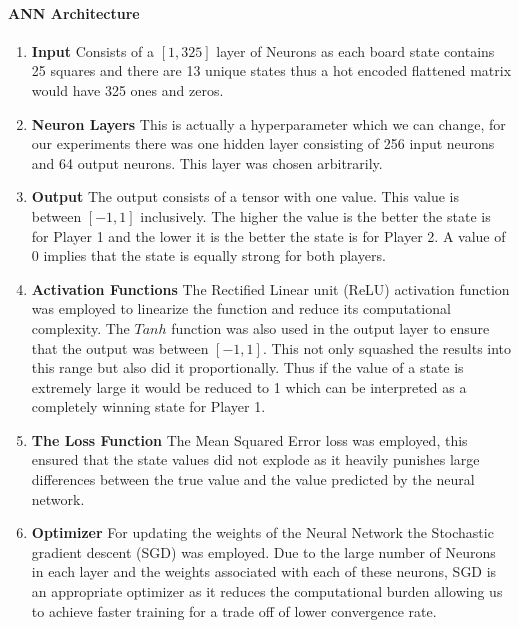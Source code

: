 \documentclass[a4paper,12pt,table]{article}
\begin{document}
\paragraph{ANN Architecture}
\begin{enumerate}
    \item \textbf{Input}
    \newline
    Consists of a $[1,325]$ layer of Neurons as each board state contains 25 squares and there are 13 unique states thus a hot encoded flattened matrix would have 325 ones and zeros.
    \item \textbf{Neuron Layers}
    \newline
    This is actually a hyperparameter which we can change, for our experiments there was one hidden layer consisting of 256 input neurons and 64 output neurons. This layer was chosen arbitrarily.
    \item \textbf{Output}
    \newline
    The output consists of a tensor with one value. This value is between $[-1,1]$ inclusively. The higher the value is the better the state is for Player 1 and the lower it is the better the state is for Player 2. A value of 0 implies that the state is equally strong for both players.
    \item \textbf{Activation Functions}
    \newline
    The Rectified Linear unit (ReLU) activation function was employed to linearize the function and reduce its computational complexity. The $Tanh$ function was also used in the output layer to ensure that the output was between $[-1,1]$. This not only squashed the results into this range but also did it proportionally. Thus if the value of a state is extremely large it would be reduced to 1 which can be interpreted as a completely winning state for Player 1.
    \item \textbf{The Loss Function}
    \newline
    The Mean Squared Error loss was employed, this ensured that the state values did not explode as it heavily punishes large differences between the true value and the value predicted by the neural network.
    \item \textbf{Optimizer}
    \newline
    For updating the weights of the Neural Network the Stochastic gradient descent (SGD) was employed. Due to the large number of Neurons in each layer and the weights associated with each of these neurons, SGD is an appropriate optimizer as it reduces the computational burden allowing us to achieve faster training for a trade off of lower convergence rate.
\end{enumerate}
\end{document}
